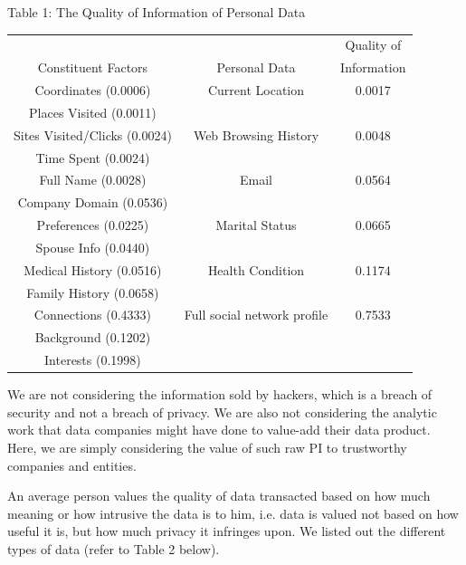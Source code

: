 \documentclass{icmmcm}
\begin{document}
\begin{center}
\caption{Table 1: The Quality of Information of Personal Data}
\begin{tabular}{ c|c|c }

  &  & Quality of \\ 
 Constituent Factors & Personal Data & Information \\
 \hline  \hline
 Coordinates (0.0006)           & Current Location              & 0.0017  \\ 
 Places Visited (0.0011)        &                               &               \\
 \hline
 Sites Visited/Clicks (0.0024)  & Web Browsing History          & 0.0048  \\
 Time Spent (0.0024)            &                               &               \\
  \hline
 Full Name (0.0028)             & Email                         & 0.0564  \\
 Company Domain (0.0536)        &                               &               \\
  \hline
 Preferences (0.0225)           & Marital Status                & 0.0665  \\
 Spouse Info (0.0440)           &                               &               \\
  \hline
 Medical History (0.0516)       & Health Condition              & 0.1174  \\
 Family History (0.0658)        &                               &               \\
  \hline
 Connections (0.4333)           & Full social network profile   & 0.7533  \\
 Background (0.1202)            &                               &               \\
 Interests (0.1998)             &                               &               \\
\end{tabular}
\end{center}

We are not considering the information sold by hackers, which is a breach of security and not a breach of privacy. We are also not considering the analytic work that data companies might have done to value-add their data product. Here, we are simply considering the value of such raw PI to trustworthy companies and entities.

An average person values the quality of data transacted based on how much meaning or how intrusive the data is to him, i.e. data is valued not based on how useful it is, but how much privacy it infringes upon. We listed out the different types of data (refer to Table 2 below). \citep{data_totalm} 
\end{document}
